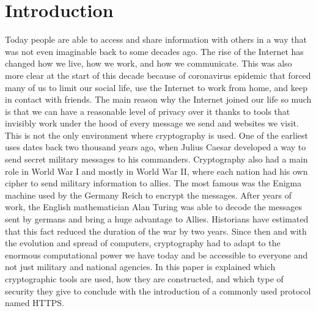 \chapter{Introduction}\label{chap:introduction}
\par
Today people are able to access and share information with others in a way that was not even imaginable back to some decades ago. The rise of the Internet has changed how we live, how we work, and how we communicate. This was also more clear at the start of this decade because of coronavirus epidemic that forced many of us to limit our social life, use the Internet to work from home, and keep in contact with friends. The main reason why the Internet joined our life so much is that we can have a reasonable level of privacy over it thanks to tools that invisibly work under the hood of every message we send and websites we visit. This is not the only environment where cryptography is used. One of the earliest uses dates back two thousand years ago, when Julius Caesar developed a way to send secret military messages to his commanders. Cryptography also had a main role in World War I and mostly in World War II, where each nation had his own cipher to send military information to allies. The most famous was the Enigma machine used by the Germany Reich to encrypt the messages. After years of work, the English mathematician Alan Turing was able to decode the messages sent by germans and bring a huge advantage to Allies. Historians have estimated that this fact reduced the duration of the war by two years. Since then and with the evolution and spread of computers, cryptography had to adapt to the enormous computational power we have today and be accessible to everyone and not just military and national agencies. In this paper is explained which cryptographic tools are used, how they are constructed, and which type of security they give to conclude with the introduction of a commonly used protocol named HTTPS.

